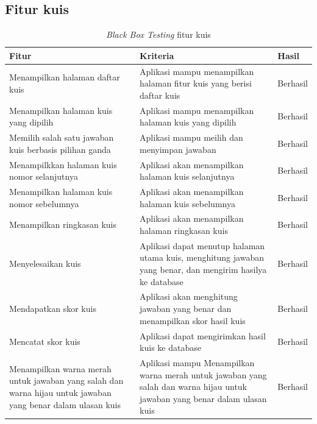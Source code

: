 \subsection{Fitur kuis}
\begin{table}[H]
	\caption{\textit{Black Box Testing} fitur kuis}
	\label{Tab:blackBoxKuis}
	\begin{tabular}{|p{}|p{}|p{}|}
		\hline
		 \centering\textbf{Fitur} & \multicolumn{1}{m{0.45\textwidth}|}{\centering \textbf{Kriteria}}&  \multicolumn{1}{m{0.1\textwidth}|}{\centering \textbf{Hasil}}\\
		\hline
		Menampilkan halaman daftar kuis
		&  Aplikasi mampu menampilkan halaman fitur kuis yang berisi daftar kuis
		& Berhasil\\
		\hline
		Menampilkan halaman kuis yang dipilih
		& Aplikasi mampu menampilkan halaman kuis yang dipilih 
		& Berhasil\\
		\hline
		Memilih salah satu jawaban kuis berbasis pilihan ganda
		& Aplikasi mampu meilih dan menyimpan jawaban 
		& Berhasil\\
		\hline
		Menampilkkan halaman kuis nomor selanjutnya
		& Aplikasi akan menampilkan halaman kuis selanjutnya
		& Berhasil\\
		\hline
		Menampilkan halaman kuis nomor sebelumnya
		& Aplikasi akan menampilkan halaman kuis sebelumnya 
		& Berhasil\\
		\hline
		Menampilkan ringkasan kuis
		& Aplikasi akan menampilkan halaman ringkasan kuis 
		& Berhasil\\
		\hline
		Menyelesaikan kuis
		& Aplikasi dapat menutup halaman utama kuis, menghitung jawaban yang benar, dan mengirim hasilya ke database
		& Berhasil\\
		\hline
		Mendapatkan skor kuis
		& Aplikasi akan  menghitung jawaban yang benar dan menampilkan skor hasil kuis
		& Berhasil\\
		\hline
		Mencatat skor kuis
		& Aplikasi dapat mengirimkan hasil kuis ke database
		& Berhasil\\
		\hline
		Menampilkan warna merah untuk jawaban yang salah dan warna hijau untuk jawaban yang benar dalam ulasan kuis
		& Aplikasi mampu Menampilkan warna merah untuk jawaban yang salah dan warna hijau untuk jawaban yang benar dalam ulasan kuis 
		& Berhasil\\
		\hline
	\end{tabular}
\end{table}
